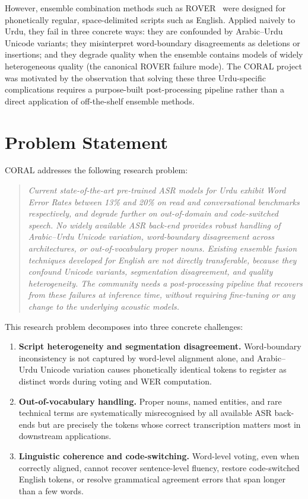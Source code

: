 However, ensemble combination methods such as ROVER~\cite{fiscus1997rover} were designed for phonetically regular, space-delimited scripts such as English. Applied naively to Urdu, they fail in three concrete ways: they are confounded by Arabic--Urdu Unicode variants; they misinterpret word-boundary disagreements as deletions or insertions; and they degrade quality when the ensemble contains models of widely heterogeneous quality (the canonical ROVER failure mode). The CORAL project was motivated by the observation that solving these three Urdu-specific complications requires a purpose-built post-processing pipeline rather than a direct application of off-the-shelf ensemble methods.

\section{Problem Statement}
\label{sec:problem}

CORAL addresses the following research problem:

\begin{quote}
\itshape
Current state-of-the-art pre-trained ASR models for Urdu exhibit Word Error Rates between 13\% and 20\% on read and conversational benchmarks respectively, and degrade further on out-of-domain and code-switched speech. No widely available ASR back-end provides robust handling of Arabic--Urdu Unicode variation, word-boundary disagreement across architectures, or out-of-vocabulary proper nouns. Existing ensemble fusion techniques developed for English are not directly transferable, because they confound Unicode variants, segmentation disagreement, and quality heterogeneity. The community needs a post-processing pipeline that recovers from these failures at inference time, without requiring fine-tuning or any change to the underlying acoustic models.
\end{quote}

This research problem decomposes into three concrete challenges:

\begin{enumerate}
  \item \textbf{Script heterogeneity and segmentation disagreement.} Word-boundary inconsistency is not captured by word-level alignment alone, and Arabic--Urdu Unicode variation causes phonetically identical tokens to register as distinct words during voting and WER computation.
  \item \textbf{Out-of-vocabulary handling.} Proper nouns, named entities, and rare technical terms are systematically misrecognised by all available ASR back-ends but are precisely the tokens whose correct transcription matters most in downstream applications.
  \item \textbf{Linguistic coherence and code-switching.} Word-level voting, even when correctly aligned, cannot recover sentence-level fluency, restore code-switched English tokens, or resolve grammatical agreement errors that span longer than a few words.
\end{enumerate}

